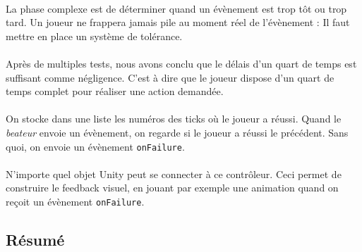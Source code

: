 \paragraph{}

La phase complexe est de déterminer quand un évènement est trop tôt ou trop tard. Un joueur ne frappera jamais pile au moment réel de l'évènement : Il faut mettre en place un système de tolérance.
\\\\
Après de multiples tests, nous avons conclu que le délais d'un quart de temps est suffisant comme négligence. C'est à dire que le joueur dispose d'un quart de temps complet pour réaliser une action demandée.
\\\\
On stocke dans une liste les numéros des ticks où le joueur a réussi. Quand le \textit{beateur} envoie un évènement, on regarde si le joueur a réussi le précédent. Sans quoi, on envoie un évènement \texttt{onFailure}.
\\\\
N'importe quel objet Unity peut se connecter à ce contrôleur. Ceci permet de construire le feedback visuel, en jouant par exemple une animation quand on reçoit un évènement \texttt{onFailure}.

\subsection{Résumé}
\label{engine_summary}
\noindent
{}
\paragraph{}

